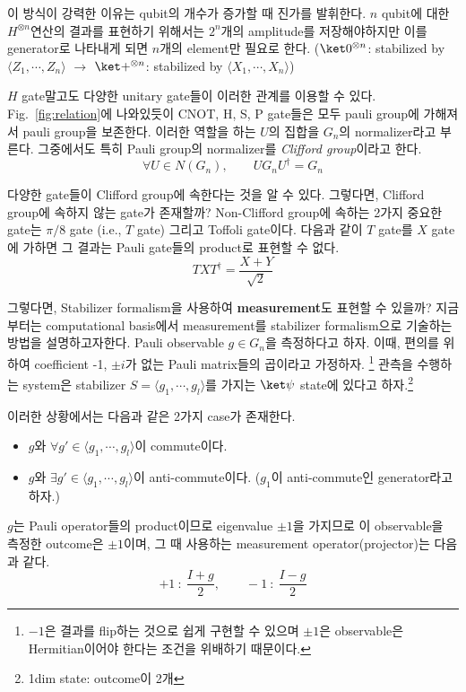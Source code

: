 이 방식이 강력한 이유는 qubit의 개수가 증가할 때 진가를 발휘한다. $n$ qubit에 대한 $H^{\otimes n}$연산의 결과를 표현하기 위해서는 $2^n$개의 amplitude를 저장해야하지만 이를 generator로 나타내게 되면 $n$개의 element만 필요로 한다. ($\ket0^{\otimes n}$: stabilized by $\langle Z_1,\cdots,Z_n \rangle$ $\rightarrow$ $\ket +^{\otimes n}$: stabilized by $\langle X_1,\cdots,X_n \rangle$)

$H$ gate말고도 다양한 unitary gate들이 이러한 관계를 이용할 수 있다. Fig.~\ref{fig:relation}에 나와있듯이 CNOT, H, S, P gate들은 모두 pauli group에 가해져서 pauli group을 보존한다. 이러한 역할을 하는 $U$의 집합을 $G_n$의 normalizer라고 부른다. 그중에서도 특히 Pauli group의 normalizer를 \textit{Clifford group}이라고 한다. 
\begin{equation*}
    \forall U \in N(G_n), \qquad UG_nU^\dagger = G_n
\end{equation*}

다양한 gate들이 Clifford group에 속한다는 것을 알 수 있다. 그렇다면, Clifford group에 속하지 않는 gate가 존재할까? Non-Clifford group에 속하는 2가지 중요한 gate는 $\pi/8$ gate (i.e., $T$ gate) 그리고 Toffoli gate이다. 다음과 같이 $T$ gate를 $X$ gate에 가하면 그 결과는 Pauli gate들의 product로 표현할 수 없다.
\begin{equation*}
    T X T^{\dagger}=\frac{X+Y}{\sqrt{2}}
\end{equation*}

그렇다면, Stabilizer formalism을 사용하여 \textbf{measurement}도 표현할 수 있을까? 지금부터는 computational basis에서 measurement를 stabilizer formalism으로 기술하는 방법을 설명하고자한다. 
Pauli observable $g \in G_n$을 측정하다고 하자. 이때, 편의를 위하여 coefficient -1, $\pm i$가 없는 Pauli matrix들의 곱이라고 가정하자. \footnote{$-1$은 결과를 flip하는 것으로 쉽게 구현할 수 있으며 $\pm 1$은 observable은 Hermitian이어야 한다는 조건을 위배하기 때문이다.}
관측을 수행하는 system은 stabilizer $S = \langle g_1, \cdots, g_l \rangle$를 가지는 $\ket \psi$ state에 있다고 하자.\footnote{1dim state: outcome이 2개}

이러한 상황에서는 다음과 같은 2가지 case가 존재한다.
\begin{itemize}
    \item $g$와 $\forall g' \in \langle g_1, \cdots, g_l \rangle$이 commute이다.
    \item $g$와 $\exists g' \in \langle g_1, \cdots, g_l \rangle$이 anti-commute이다. ($g_1$이 anti-commute인 generator라고 하자.)
\end{itemize}
$g$는 Pauli operator들의 product이므로 eigenvalue $\pm 1$을 가지므로 이 observable을 측정한 outcome은 $\pm 1$이며, 그 때 사용하는 measurement operator(projector)는 다음과 같다.
\begin{equation*}
    +1\ :\ \frac{I+g}{2},\qquad -1\ :\ \frac{I-g}{2}
\end{equation*}

